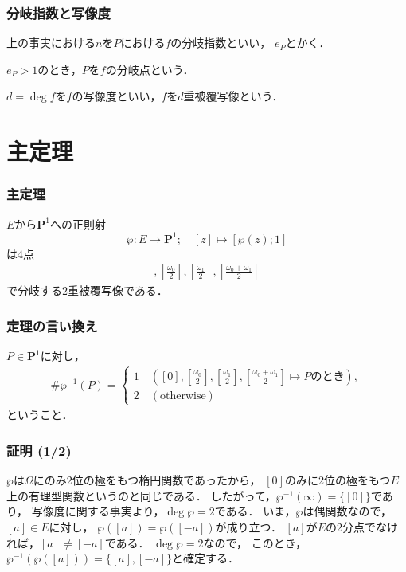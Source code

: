 \documentclass[dvipdfmx,12pt,aspectratio=169]{beamer}%
\newcommand{\pp}{\mathbf{P}}
\begin{document}
\begin{frame}
    \frametitle{分岐指数と写像度}

    \begin{definition}[分岐指数]
        上の事実における$n$を$P$における$f$の分岐指数といい，
        $e_P$とかく．
        
        $e_P>1$のとき，$P$を$f$の分岐点という．
    \end{definition}
    \begin{definition}[写像度]
        $d=\deg f$を$f$の写像度といい，$f$を$d$重被覆写像という．
    \end{definition}
\end{frame}

\section{主定理}
\begin{frame}\frametitle{主定理}
    \begin{Theorem}
        $E$から$\pp^1$への正則射
        \begin{equation*}
            \wp\colon E\to\pp^1;\quad [z]\mapsto [\wp(z);1]    
        \end{equation*}は$\mathrm{4}$点
        \begin{align*}
            [0],
            \left[\frac{\omega_0}{2}\right],
            \left[\frac{\omega_1}{2}\right],
            \left[\frac{\omega_0+\omega_1}{2}\right]
        \end{align*}
        で分岐する$\mathrm{2}$重被覆写像である．
    \end{Theorem}
\end{frame}

\begin{frame}\frametitle{定理の言い換え}
        $P\in \pp^1$に対し，    
    \begin{align*}
        \#\wp^{-1}(P)=
        \begin{cases}
            1\quad ([0],\left[\frac{\omega_0}{2}\right], 
            \left[\frac{\omega_1}{2}\right], 
            \left[\frac{\omega_0+\omega_1}{2}\right]\mapsto P\text{のとき}), \\    
            2\quad (\text{otherwise})
        \end{cases}
    \end{align*}
    ということ．
\end{frame}

\begin{frame}
    \frametitle{証明 (1/2)}
    \setlength{\baselineskip}{18pt}
    $\wp$は$\Omega$にのみ2位の極をもつ楕円関数であったから，
    $[0]$のみに2位の極をもつ$E$上の有理型関数というのと同じである．
    したがって，$\wp^{-1}(\infty)=\{[0]\}$であり，
    写像度に関する事実より，$\deg\wp=2$である．
    いま，$\wp$は偶関数なので，$[a]\in E$に対し，
    $\wp([a])=\wp([-a])$が成り立つ．
    $[a]$が$E$の2分点でなければ，$[a]\neq[-a]$である．
    $\deg\wp=2$なので，
    このとき，$\wp^{-1}(\wp([a]))=\{[a],[-a]\}$と確定する．
\end{frame}
\end{document}
